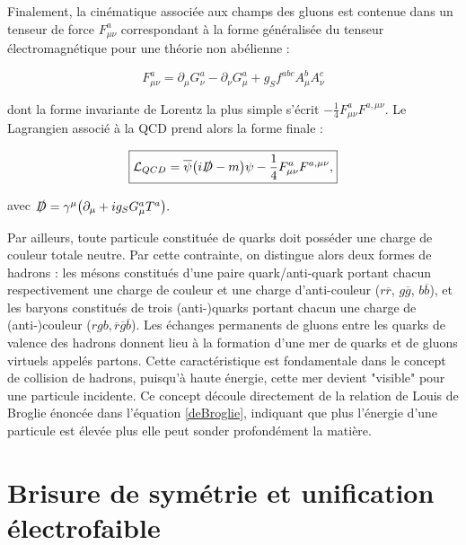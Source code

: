     Finalement, la cinématique associée aux champs des gluons est contenue dans un tenseur de force $F^a_{\mu\nu}$ correspondant à la forme généralisée du tenseur électromagnétique pour une théorie non abélienne :

    \begin{equation}
        F^a_{\mu\nu}=\partial_{\mu}G^a_{\nu}-\partial_{\nu}G^a_{\mu}+g_Sf^{abc}A_{\mu}^bA_{\nu}^c
    \end{equation}

    dont la forme invariante de Lorentz la plus simple s'écrit $-\frac{1}{4}F^a_{\mu\nu}F^{a,\mu\nu}$. Le Lagrangien associé à la QCD prend alors la forme finale :

    \begin{equation}
    \boxed{
        \mathcal{L}_{\tiny QCD}=\overline{\psi}\bigl(i\slashed{D}-m\bigr)\psi - \frac{1}{4}F^a_{\mu\nu}F^{a,\mu\nu},
    }
    \end{equation}

    avec $\slashed D = \gamma^{\mu}\bigl(\partial_{\mu}+ig_SG^a_{\mu}T^a\bigr).$

    Par ailleurs, toute particule constituée de quarks doit posséder une charge de couleur totale neutre. Par cette contrainte, on distingue alors deux formes de hadrons : les mésons constitués d'une paire quark/anti-quark portant chacun respectivement une charge de couleur et une charge d'anti-couleur ($r\overline{r}$, $g\overline{g}$, $b\overline{b}$), et les baryons constitués de trois (anti-)quarks portant chacun une charge de (anti-)couleur ($rgb, \overline{r}\overline{g}\overline{b}$). Les échanges permanents de gluons entre les quarks de valence des hadrons donnent lieu à la formation d'une mer de quarks et de gluons virtuels appelés partons. Cette caractéristique est fondamentale dans le concept de collision de hadrons, puisqu'à haute énergie, cette mer devient "visible" pour une particule incidente. Ce concept découle directement de la relation de Louis de Broglie énoncée dans l'équation \ref{deBroglie}, indiquant que plus l'énergie d'une particule est élevée plus elle peut sonder profondément la matière.
    
    \section{Brisure de symétrie et unification électrofaible}
    \label{EWK}

